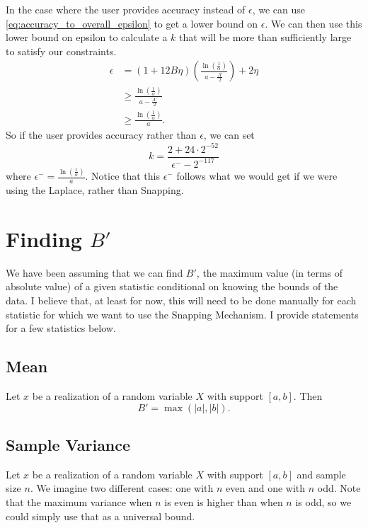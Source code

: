 \documentclass[11pt]{scrartcl} %
\begin{document}
In the case where the user provides accuracy instead of $\epsilon$, we can use
\eqref{eq:accuracy_to_overall_epsilon}
to get a lower bound on $\epsilon$. We can then use this lower bound on epsilon to
calculate a $k$ that will be more than sufficiently large to satisfy our constraints.
\begin{align*}
	\epsilon &= (1+12B\eta) \left( \frac{\ln\left( \frac{1}{\alpha} \right)}{a - \frac{\Lambda'}{2}} \right) + 2\eta \\
			 &\geq \frac{\ln\left( \frac{1}{\alpha} \right)}{a - \frac{\Lambda'}{2}} \\
			 &\geq \frac{\ln\left( \frac{1}{\alpha} \right)}{a}.
\end{align*}
So if the user provides accuracy rather than $\epsilon$, we can set
\[ k = \frac{2+24 \cdot 2^{-52}}{\epsilon^{-} - 2^{-117}} \]
where $\epsilon^{-} = \frac{\ln\left( \frac{1}{\alpha} \right)}{a}$.
Notice that this $\epsilon^{-}$ follows what we would get if we were using the Laplace,
rather than Snapping.

\section{Finding $B'$}
\label{sec:finding_B_prime}
We have been assuming that we can find $B'$, the maximum value (in terms of absolute value) of a given statistic conditional on knowing
the bounds of the data. I believe that, at least for now, this will need to be done manually for each statistic
for which we want to use the Snapping Mechanism. I provide statements for a few statistics below.

\subsection{Mean}
\label{subsec:Bprime_mean}
Let $x$ be a realization of a random variable $X$ with support $[a,b]$. Then
\[ B' = \max \left( \vert a \vert, \vert b \vert \right). \]

\subsection{Sample Variance}
\label{subsec:Bprime_sample_variance}
Let $x$ be a realization of a random variable $X$ with support $[a,b]$ and sample size $n$.
We imagine two different cases: one with $n$ even and one with $n$ odd.
Note that the maximum variance when $n$ is even is higher than when $n$ is odd,
so we could simply use that as a universal bound. \newline
\end{document}

